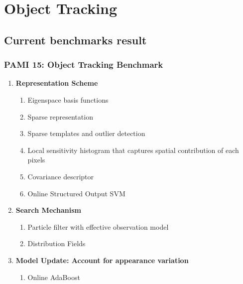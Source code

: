 \chapter{Object Tracking}

\section{Current benchmarks result}

  \subsection{PAMI 15: Object Tracking Benchmark}\cite{wu2015object}

  \begin{enumerate}

    \item \textbf{Representation Scheme}
      \begin{enumerate}
        \item Eigenspace basis functions
          \cite{black1998eigentracking}
        \item Sparse representation
          \cite{zhong2012robust}
        \item Sparse templates and
          outlier detection
          \cite{mei2011robust}
        \item Local
          sensitivity
          histogram that
          captures
          spatial
          contribution
          of each pixels
          \cite{he2013visual}
        \item
          Covariance
          descriptor
          \cite{tuzel2006region}
        \item
          Online
          Structured
          Output
          SVM
          \cite{hare2016struck}
      \end{enumerate}  

    \item
      \textbf{Search
      Mechanism}
      \begin{enumerate}
        \item
          Particle
          filter
          with
          effective
          observation
          model
        \item
          Distribution
          Fields
          \cite{sevilla2012distribution}
      \end{enumerate}

    \item
      \textbf{Model
      Update:
      Account
      for
      appearance
      variation}
      \begin{enumerate}
        \item
          Online
          AdaBoost
          \cite{grabner2006real}
      \end{enumerate}


\end{enumerate}

